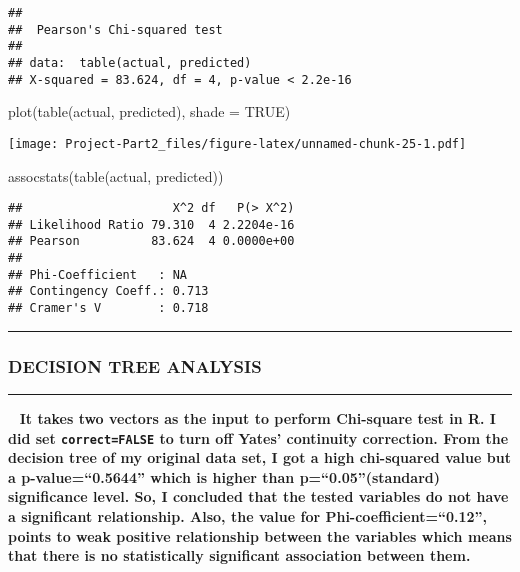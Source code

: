 \documentclass[
]{article}
\newenvironment{Shaded}{\begin{snugshade}}{\end{snugshade}}
\newcommand{\AttributeTok}[1]{\textcolor[rgb]{0.77,0.63,0.00}{#1}}
\newcommand{\ConstantTok}[1]{\textcolor[rgb]{0.00,0.00,0.00}{#1}}
\newcommand{\FunctionTok}[1]{\textcolor[rgb]{0.00,0.00,0.00}{#1}}
\newcommand{\NormalTok}[1]{#1}
\begin{document}
\begin{verbatim}
## 
##  Pearson's Chi-squared test
## 
## data:  table(actual, predicted)
## X-squared = 83.624, df = 4, p-value < 2.2e-16
\end{verbatim}

\begin{Shaded}
\begin{Highlighting}[]
\FunctionTok{plot}\NormalTok{(}\FunctionTok{table}\NormalTok{(actual, predicted),}
\AttributeTok{shade =} \ConstantTok{TRUE}\NormalTok{)}
\end{Highlighting}
\end{Shaded}

\texttt{[image: Project-Part2\_files/figure-latex/unnamed-chunk-25-1.pdf]}

\begin{Shaded}
\begin{Highlighting}[]
\FunctionTok{assocstats}\NormalTok{(}\FunctionTok{table}\NormalTok{(actual, predicted))}
\end{Highlighting}
\end{Shaded}

\begin{verbatim}
##                     X^2 df   P(> X^2)
## Likelihood Ratio 79.310  4 2.2204e-16
## Pearson          83.624  4 0.0000e+00
## 
## Phi-Coefficient   : NA 
## Contingency Coeff.: 0.713 
## Cramer's V        : 0.718
\end{verbatim}

\begin{center}\rule{0.5\linewidth}{0.5pt}\end{center}

\hypertarget{decision-tree-analysis}{%
\subsubsection{\texorpdfstring{\textbf{DECISION TREE
ANALYSIS}}{DECISION TREE ANALYSIS}}\label{decision-tree-analysis}}

\begin{center}\rule{0.5\linewidth}{0.5pt}\end{center}

~ \textbf{It takes two vectors as the input to perform Chi-square test
in R. I did set \texttt{correct=FALSE} to turn off Yates' continuity
correction. From the decision tree of my original data set, I got a high
chi-squared value but a p-value=``0.5644'' which is higher than
p=``0.05''(standard) significance level. So, I concluded that the tested
variables do not have a significant relationship. Also, the value for
Phi-coefficient=``0.12'', points to weak positive relationship between
the variables which means that there is no statistically significant
association between them.}
\end{document}
